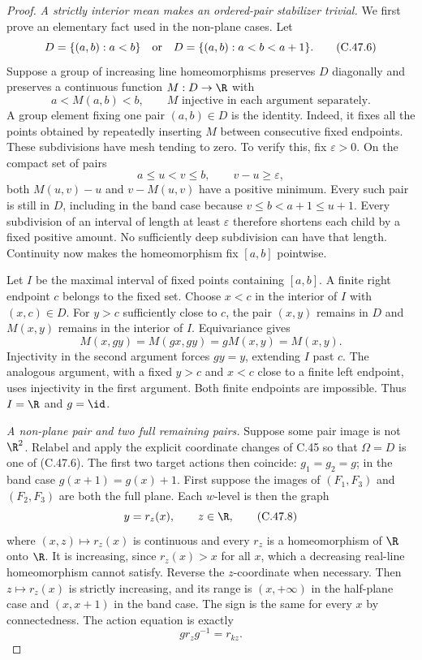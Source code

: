 \begin{proof}
\emph{A strictly interior mean makes an ordered-pair stabilizer trivial.}
We first prove an elementary fact used in the non-plane cases.
Let
\[
 D=\{(a,b):a<b\}
 \quad\hbox{or}\quad
 D=\{(a,b):a<b<a+1\}.
                                                        \tag{C.47.6}
\]
Suppose a group of increasing line homeomorphisms preserves $D$
diagonally and preserves a continuous function $M:D\to\R$ with
\[
 a<M(a,b)<b,
 \qquad M\text{ injective in each argument separately}.   \tag{C.47.7}
\]
A group element fixing one pair $(a,b)\in D$ is the identity.
Indeed, it fixes all the points obtained by repeatedly inserting
$M$ between consecutive fixed endpoints. These subdivisions
have mesh tending to zero. To verify this, fix $\varepsilon>0$.
On the compact set of pairs
\[
 a\leq u<v\leq b,\qquad v-u\geq\varepsilon,
 \]
both $M(u,v)-u$ and $v-M(u,v)$ have a positive minimum.
Every such pair is still in $D$, including in the band case
because $v\leq b<a+1\leq u+1$.
Every subdivision of an interval of length at least
$\varepsilon$ therefore shortens each child by a fixed positive
amount. No sufficiently deep subdivision can have that length.
Continuity now makes the homeomorphism fix $[a,b]$ pointwise.

Let $I$ be the maximal interval of fixed points containing
$[a,b]$. A finite right endpoint $c$ belongs to the fixed set.
Choose $x<c$ in the interior of $I$ with $(x,c)\in D$.
For $y>c$ sufficiently close to $c$, the pair $(x,y)$ remains in
$D$ and $M(x,y)$ remains in the interior of $I$. Equivariance
gives
\[
 M(x,gy)=M(gx,gy)=gM(x,y)=M(x,y).
 \]
Injectivity in the second argument forces $gy=y$, extending
$I$ past $c$. The analogous argument, with a fixed $y>c$ and
$x<c$ close to a finite left endpoint, uses injectivity in the
first argument. Both finite endpoints are impossible.
Thus $I=\R$ and $g=\id$.

\emph{A non-plane pair and two full remaining pairs.}
Suppose some pair image is not $\R^2$. Relabel and apply the
explicit coordinate changes of C.45 so that
$\Omega=D$ is one of (C.47.6).
The first two target actions then coincide:
$g_1=g_2=g$; in the band case $g(x+1)=g(x)+1$.
First suppose the images of $(F_1,F_3)$ and $(F_2,F_3)$ are both
the full plane. Each $w$-level is then the graph
\[
                   y=r_z(x),\qquad z\in\R,               \tag{C.47.8}
\]
where $(x,z)\mapsto r_z(x)$ is continuous and every $r_z$ is
a homeomorphism of $\R$ onto $\R$.
It is increasing, since $r_z(x)>x$ for all $x$, which a
decreasing real-line homeomorphism cannot satisfy.
Reverse the $z$-coordinate when necessary. Then
$z\mapsto r_z(x)$ is strictly increasing, and its range is
$(x,+\infty)$ in the half-plane case and $(x,x+1)$ in the
band case. The sign is the same for every $x$ by connectedness.
The action equation is exactly
\[
                      g r_z g^{-1}=r_{kz}.               \tag{C.47.9}
\]


\end{proof}
